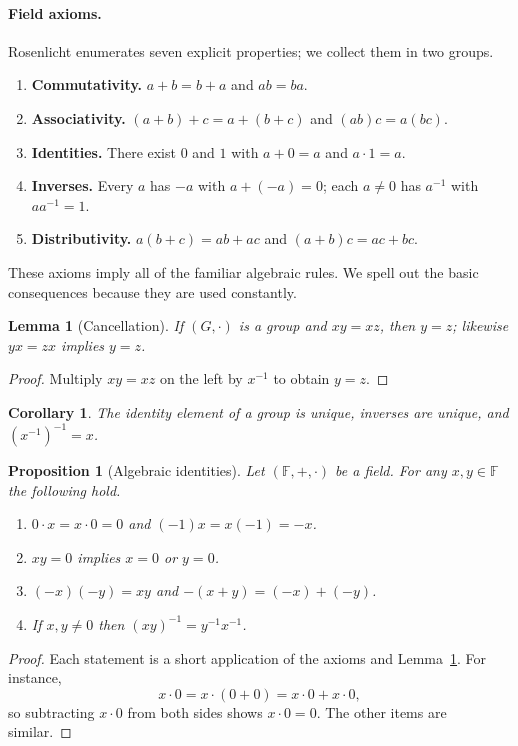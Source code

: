 \documentclass{article}
\theoremstyle{definition}
\theoremstyle{plain}
\newtheorem{lemma}{Lemma}[section]
\newtheorem{proposition}{Proposition}[section]
\newtheorem{corollary}{Corollary}[theorem]
\begin{document}
	\paragraph{Field axioms.}
	Rosenlicht enumerates seven explicit properties; we collect them in two groups.
	\begin{enumerate}
		\item[(F1)] \textbf{Commutativity.} $a+b=b+a$ and $ab=ba$.
		\item[(F2)] \textbf{Associativity.} $(a+b)+c=a+(b+c)$ and $(ab)c=a(bc)$.
		\item[(F3)] \textbf{Identities.} There exist $0$ and $1$ with $a+0=a$ and $a\cdot 1=a$.
		\item[(F4)] \textbf{Inverses.} Every $a$ has $-a$ with $a+(-a)=0$; each $a\neq 0$ has $a^{-1}$ with $aa^{-1}=1$.
		\item[(F5)] \textbf{Distributivity.} $a(b+c)=ab+ac$ and $(a+b)c=ac+bc$.
	\end{enumerate}
	These axioms imply all of the familiar algebraic rules. We spell out the basic consequences because they are used constantly.

	\begin{lemma}[Cancellation]\label{lem:cancellation}
		If $(G,\cdot)$ is a group and $xy=xz$, then $y=z$; likewise $yx=zx$ implies $y=z$.
	\end{lemma}
	\begin{proof}
		Multiply $xy=xz$ on the left by $x^{-1}$ to obtain $y=z$.
	\end{proof}

	\begin{corollary}
		The identity element of a group is unique, inverses are unique, and $(x^{-1})^{-1}=x$.
	\end{corollary}

	\begin{proposition}[Algebraic identities]\label{prop:field-identities}
		Let $(\mathbb{F},+,\cdot)$ be a field. For any $x,y \in \mathbb{F}$ the following hold.
		\begin{enumerate}
			\item $0\cdot x = x\cdot 0 = 0$ and $(-1)x = x(-1) = -x$.
			\item $xy=0$ implies $x=0$ or $y=0$.
			\item $(-x)(-y)=xy$ and $-(x+y)=(-x)+(-y)$.
			\item If $x,y\neq 0$ then $(xy)^{-1} = y^{-1}x^{-1}$.
		\end{enumerate}
	\end{proposition}
	\begin{proof}
		Each statement is a short application of the axioms and Lemma~\ref{lem:cancellation}. For instance,
		\[
			x\cdot 0 = x\cdot (0+0) = x\cdot 0 + x\cdot 0,
		\]
		so subtracting $x\cdot 0$ from both sides shows $x\cdot 0=0$. The other items are similar.
	\end{proof}
\end{document}
